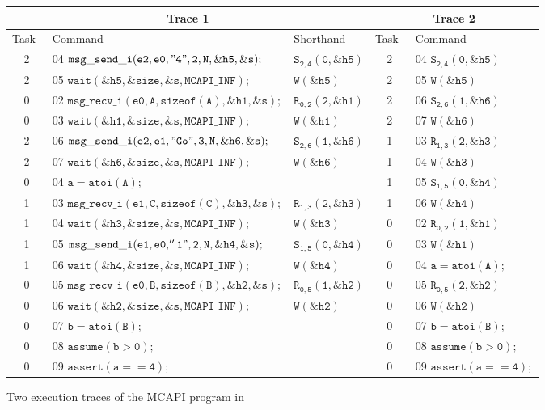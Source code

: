 \begin{figure*}
\begin{center}
\setlength{\tabcolsep}{1pt}
\scriptsize \begin{tabular}[t]{|c|l|l||c|l|}
\hline
\multicolumn{3}{|c||}{Trace 1} & \multicolumn{2}{|c|}{Trace 2}\\
\hline
Task\  & Command\ & Shorthand\ & Task\ & Command\  \\
\hline
2 & 04 $\mathtt{msg\_send\_i(e2,e0,"4",2,N,\&h5,\&s);}$ & $\mathtt{S_{2,4}(0,\&h5)}$ & 2 & 04 $\mathtt{S_{2,4}(0,\&h5)}$ \\
2 & 05 $\mathtt{wait(\&h5,\&size,\&s,MCAPI\_INF);}$ & $\mathtt{W(\&h5)}$ & 2 & 05 $\mathtt{W(\&h5)}$ \\
0 & 02 $\mathtt{msg\_recv\_i(e0,A,sizeof(A),\&h1,\&s);}$ & $\mathtt{R_{0,2}(2,\&h1)}$ & 2 & 06 $\mathtt{S_{2,6}(1,\&h6)}$ \\
0 & 03 $\mathtt{wait(\&h1,\&size,\&s,MCAPI\_INF);}$ & $\mathtt{W(\&h1)}$ & 2 & 07 $\mathtt{W(\&h6)}$ \\
2 & 06 $\mathtt{msg\_send\_i(e2,e1,"Go",3,N,\&h6,\&s);}$ & $\mathtt{S_{2,6}(1,\&h6)}$ & 1 & 03 $\mathtt{R_{1,3}(2,\&h3)}$ \\
2 & 07 $\mathtt{wait(\&h6,\&size,\&s,MCAPI\_INF);}$ & $\mathtt{W(\&h6)}$ & 1 & 04 $\mathtt{W(\&h3)}$ \\
0 & 04 $\mathtt{a = atoi(A);}$ & & 1 & 05 $\mathtt{S_{1,5}(0,\&h4)}$ \\
1 & 03 $\mathtt{msg\_recv\_i(e1,C,sizeof(C),\&h3,\&s);}$ & $\mathtt{R_{1,3}(2,\&h3)}$ & 1 & 06 $\mathtt{W(\&h4)}$ \\
1 & 04 $\mathtt{wait(\&h3,\&size,\&s,MCAPI\_INF);}$ & $\mathtt{W(\&h3)}$ & 0 & 02 $\mathtt{R_{0,2}(1,\&h1)}$ \\
1 & 05 $\mathtt{msg\_send\_i(e1,e0,''1",2,N,\&h4,\&s);}$ & $\mathtt{S_{1,5}(0,\&h4)}$ & 0 & 03 $\mathtt{W(\&h1)}$ \\
1 & 06 $\mathtt{wait(\&h4,\&size,\&s,MCAPI\_INF);}$ & $\mathtt{W(\&h4)}$ & 0 & 04 $\mathtt{a = atoi(A);}$ \\
0 & 05 $\mathtt{msg\_recv\_i(e0,B,sizeof(B),\&h2,\&s);}$ & $\mathtt{R_{0,5}(1,\&h2)}$ & 0 & 05 $\mathtt{R_{0,5}(2,\&h2)}$\\
0 & 06 $\mathtt{wait(\&h2,\&size,\&s,MCAPI\_INF);}$ & $\mathtt{W(\&h2)}$ & 0 & 06 $\mathtt{W(\&h2)}$ \\
0 & 07 $\mathtt{b = atoi(B);}$ & & 0 & 07 $\mathtt{b = atoi(B);}$ \\
0 & 08 $\mathtt{assume (b > 0);}$ & & 0 & 08 $\mathtt{assume (b > 0);}$ \\
0 & 09 $\mathtt{assert(a == 4);}$ & & 0 & 09 $\mathtt{assert(a == 4);}$ \\
\hline
\end{tabular}
\end{center}
\caption{Two execution traces of the MCAPI program in }
\label{fig:trace}
\end{figure*}

